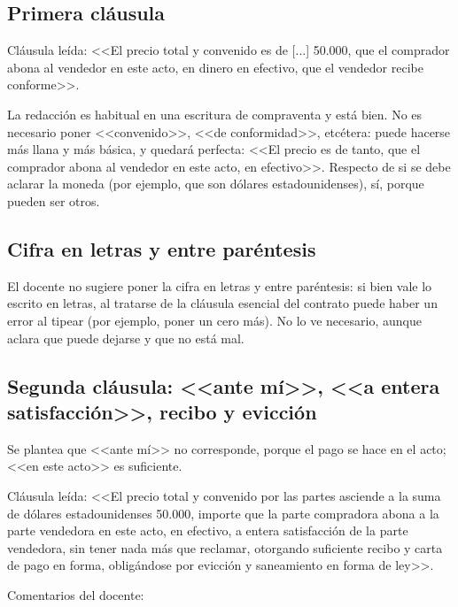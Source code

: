 \documentclass[12pt,oneside]{book}
\begin{document}
\subsection{Primera cl\'ausula}

Cl\'ausula le\'ida: <<El precio total y convenido es de [...] 50.000, que el comprador abona al vendedor en este acto, en dinero en efectivo, que el vendedor recibe conforme>>.

La redacci\'on es habitual en una escritura de compraventa y est\'a bien. No es necesario poner <<convenido>>, <<de conformidad>>, etc\'etera: puede hacerse m\'as llana y m\'as b\'asica, y quedar\'a perfecta: <<El precio es de tanto, que el comprador abona al vendedor en este acto, en efectivo>>. Respecto de si se debe aclarar la moneda (por ejemplo, que son d\'olares estadounidenses), s\'i, porque pueden ser otros.

\subsection{Cifra en letras y entre par\'entesis}

El docente no sugiere poner la cifra en letras y entre par\'entesis: si bien vale lo escrito en letras, al tratarse de la cl\'ausula esencial del contrato puede haber un error al tipear (por ejemplo, poner un cero m\'as). No lo ve necesario, aunque aclara que puede dejarse y que no est\'a mal.

\subsection{Segunda cl\'ausula: <<ante m\'i>>, <<a entera satisfacci\'on>>, recibo y evicci\'on}

Se plantea que <<ante m\'i>> no corresponde, porque el pago se hace en el acto; <<en este acto>> es suficiente.

Cl\'ausula le\'ida: <<El precio total y convenido por las partes asciende a la suma de d\'olares estadounidenses 50.000, importe que la parte compradora abona a la parte vendedora en este acto, en efectivo, a entera satisfacci\'on de la parte vendedora, sin tener nada m\'as que reclamar, otorgando suficiente recibo y carta de pago en forma, oblig\'andose por evicci\'on y saneamiento en forma de ley>>.

Comentarios del docente:
\end{document}
